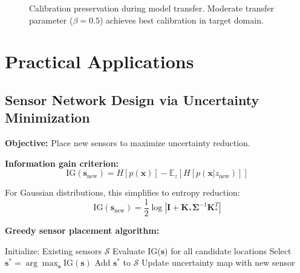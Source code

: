 \documentclass[11pt,letterpaper]{article}
\newcommand{\bx}{\mathbf{x}}
\begin{document}
\begin{figure}[h]
\centering
\caption{Calibration preservation during model transfer. Moderate transfer parameter ($\beta = 0.5$) achieves best calibration in target domain.}
\label{fig:transfer_calibration}
\end{figure}


\section{Practical Applications} \label{sec:applications}

\subsection{Sensor Network Design via Uncertainty Minimization}

\textbf{Objective:} Place new sensors to maximize uncertainty reduction.

\textbf{Information gain criterion:}
\begin{equation}
\text{IG}(\mathbf{s}_{\text{new}}) = H[p(\bx)] - \mathbb{E}_{z} \left[ H[p(\bx | z_{\text{new}})] \right]
\label{eq:information_gain}
\end{equation}

For Gaussian distributions, this simplifies to entropy reduction:
\begin{equation}
\text{IG}(\mathbf{s}_{\text{new}}) = \frac{1}{2} \log \left| \mathbf{I} + \mathbf{K}_* \boldsymbol{\Sigma}^{-1} \mathbf{K}_*^T \right|
\label{eq:information_gain_gaussian}
\end{equation}

\textbf{Greedy sensor placement algorithm:}
\begin{algorithmic}
\STATE Initialize: Existing sensors $\mathcal{S}$
    \STATE Evaluate IG($\mathbf{s}$) for all candidate locations
    \STATE Select $\mathbf{s}^* = \arg\max_{\mathbf{s}} \text{IG}(\mathbf{s})$
    \STATE Add $\mathbf{s}^*$ to $\mathcal{S}$
    \STATE Update uncertainty map with new sensor
\ENDWHILE
\end{algorithmic}
\end{document}
